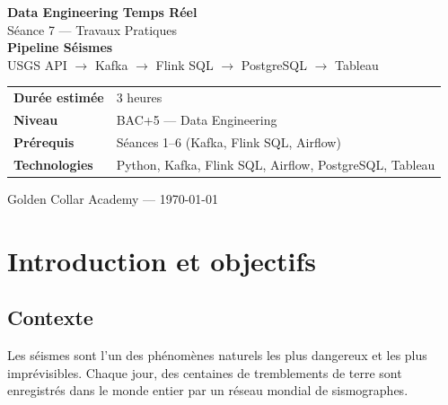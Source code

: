 \documentclass[12pt,a4paper]{article}
\begin{document}
\begin{titlepage}
  \centering
  \vspace*{2cm}

  {\LARGE\bfseries\color{titlegray} Data Engineering Temps Réel}\\[0.4cm]
  {\large\color{gray} Séance 7 --- Travaux Pratiques}\\[2cm]

  {\Huge\bfseries\color{kafkared} Pipeline Séismes}\\[0.3cm]
  {\Large\color{flinkblue} USGS API $\to$ Kafka $\to$ Flink SQL $\to$ PostgreSQL $\to$ Tableau}\\[2.5cm]

  \begin{tabular}{ll}
    \textbf{Durée estimée} & 3 heures \\[0.3cm]
    \textbf{Niveau}        & BAC+5 --- Data Engineering \\[0.3cm]
    \textbf{Prérequis}     & Séances 1--6 (Kafka, Flink SQL, Airflow) \\[0.3cm]
    \textbf{Technologies}  & Python, Kafka, Flink SQL, Airflow, PostgreSQL, Tableau \\
  \end{tabular}

  \vfill
  {\small\color{gray} Golden Collar Academy --- \today}
\end{titlepage}


\section*{Introduction et objectifs}

\subsection*{Contexte}

Les séismes sont l'un des phénomènes naturels les plus dangereux et les plus imprévisibles.
Chaque jour, des centaines de tremblements de terre sont enregistrés dans le monde entier
par un réseau mondial de sismographes.
\end{document}
